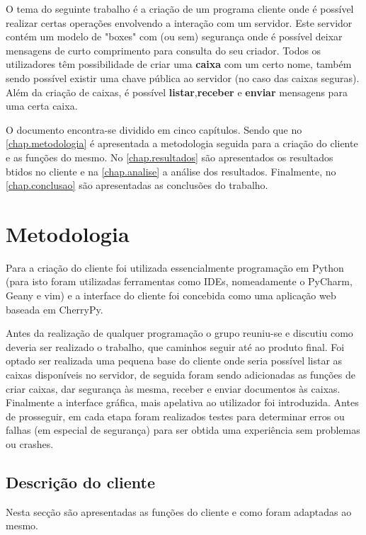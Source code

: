 \documentclass{report}
\begin{document}
O tema do seguinte trabalho é a criação de um programa cliente onde é possível realizar certas operações envolvendo a interação com um servidor.
Este servidor contém um modelo de "boxes" com (ou sem) segurança onde é possível deixar mensagens de curto comprimento para consulta do seu criador. Todos os utilizadores têm possibilidade de criar uma \textbf{caixa} com um certo nome, também sendo possível existir uma chave pública ao servidor (no caso das caixas seguras). Além da criação de caixas, é possível \textbf{listar},\textbf{receber} e \textbf{enviar} mensagens para uma certa caixa.

O documento encontra-se dividido em cinco capítulos.
Sendo que no \autoref{chap.metodologia} é apresentada a metodologia seguida para a criação do cliente e
as funções do mesmo.
No \autoref{chap.resultados} são apresentados os resultados btidos no cliente e na \autoref{chap.analise} a análise dos resultados.
Finalmente, no \autoref{chap.conclusao} são apresentadas
as conclusões do trabalho.

\chapter{Metodologia}
\label{chap.metodologia}

Para a criação do cliente foi utilizada essencialmente programação em Python (para isto foram utilizadas ferramentas como IDEs, nomeadamente o PyCharm, Geany e vim) e a interface do cliente foi concebida como uma aplicação web baseada em CherryPy.

Antes da realização de qualquer programação o grupo reuniu-se e discutiu como deveria ser realizado o trabalho, que caminhos seguir até ao produto final. Foi optado ser realizada uma pequena base do cliente onde seria possível listar as caixas disponíveis no servidor, de seguida foram sendo adicionadas as funções de criar caixas, dar segurança às mesma, receber e enviar documentos às caixas. Finalmente a interface gráfica, mais apelativa ao utilizador foi introduzida. Antes de prosseguir, em cada etapa foram realizados testes para determinar erros ou falhas (em especial de segurança) para ser obtida uma experiência sem problemas ou crashes.

\section{Descrição do cliente}
\label{subs.desc}
Nesta secção são apresentadas as funções do cliente e como foram adaptadas ao mesmo.
\end{document}
